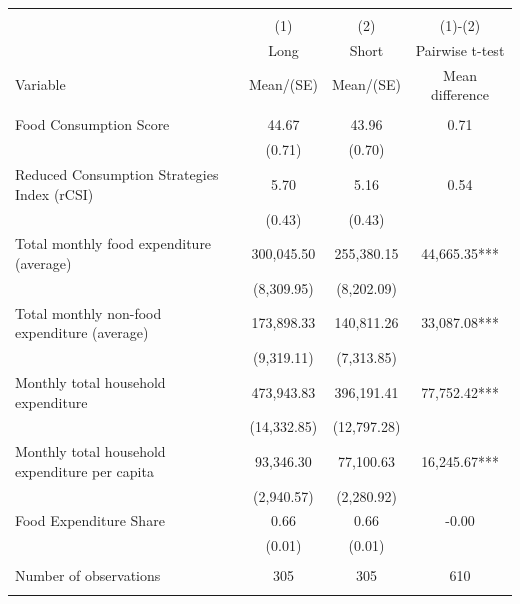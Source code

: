 
\begin{tabular}{@{\extracolsep{5pt}}lccc}
\\[-1.8ex]\hline \hline \\[-1.8ex]
 & \multicolumn{1}{c}{(1)}  & \multicolumn{1}{c}{(2)}  & \multicolumn{1}{c}{(1)-(2)} \\
 & \multicolumn{1}{c}{Long}  & \multicolumn{1}{c}{Short}  & \multicolumn{1}{c}{Pairwise t-test}  \\
Variable & Mean/(SE) & Mean/(SE) & Mean difference \\ \hline \\[-1.8ex] 
Food Consumption Score   & 44.67    & 43.96    & 0.71   \\
 & (0.71)  & (0.70)  &  \\ [1ex]
Reduced Consumption Strategies Index (rCSI)   & 5.70    & 5.16    & 0.54   \\
 & (0.43)  & (0.43)  &  \\ [1ex]
Total monthly food expenditure (average)   & 300,045.50    & 255,380.15    & 44,665.35***   \\
 & (8,309.95)  & (8,202.09)  &  \\ [1ex]
Total monthly non-food expenditure (average)   & 173,898.33    & 140,811.26    & 33,087.08***   \\
 & (9,319.11)  & (7,313.85)  &  \\ [1ex]
Monthly total household expenditure   & 473,943.83    & 396,191.41    & 77,752.42***   \\
 & (14,332.85)  & (12,797.28)  &  \\ [1ex]
Monthly total household expenditure per capita   & 93,346.30    & 77,100.63    & 16,245.67***   \\
 & (2,940.57)  & (2,280.92)  &  \\ [1ex]
Food Expenditure Share   & 0.66    & 0.66    & -0.00   \\
 & (0.01)  & (0.01)  &  \\ [1ex]
\hline \\[-1.8ex]
Number of observations  & 305   & 305  & 610  \\
\hline \hline \\[-1.8ex]

\end{tabular}
